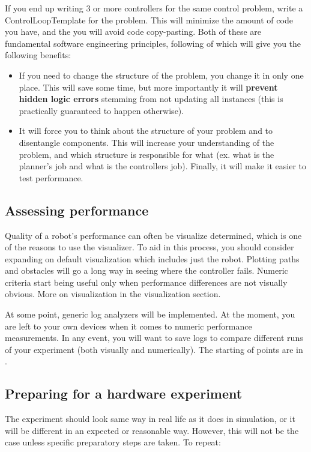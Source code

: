 If you end up writing 3 or more controllers for the same control problem,
write a ControlLoopTemplate for the problem.
This will minimize the amount of code you have, and the you will avoid 
code copy-pasting. 
Both of these are fundamental software engineering principles,
following of which will give you the following benefits:
\begin{itemize}
\item If you need to change the structure of the problem, you
		change it in only one place. This will save some time,
		but more importantly it will \textbf{prevent hidden logic errors}
		stemming from not updating all instances 
		(this is practically guaranteed to happen otherwise).
\item It will force you to think about the structure of your problem
		and to disentangle components. This will increase your 
		understanding of the problem, and which structure is responsible for what
		(ex. what is the planner's job and what is the controllers job).
		Finally, it will make it easier to test performance.
\end{itemize}

\subsection{Assessing performance}
Quality of a robot's performance can often be visualize determined,
which is one of the reasons to use the visualizer.
To aid in this process, you should consider expanding on default visualization
which includes just the robot. Plotting paths and obstacles
will go a long way in seeing where the controller fails.
Numeric criteria start being useful only when performance differences
are not visually obvious.
More on visualization in the visualization section.

At some point, generic log analyzers will be implemented. 
At the moment, you are left to your own devices when it comes
to numeric performance measurements. 
In any event, you will want to save logs
to compare different runs of your experiment (both visually and numerically).
The starting of points are in 
.

\subsection{Preparing for a hardware experiment}
The experiment should look same way in real life as it does
in simulation, or it will be different in an expected or reasonable way.
However, this will not be the case unless specific preparatory steps are taken.
To repeat:
\newline
\vspace{10pt}
\noindent{}
\vspace{10pt}


